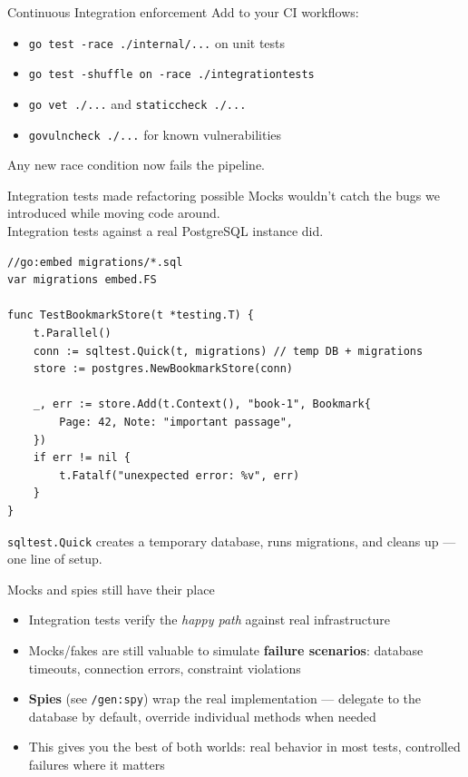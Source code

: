 \documentclass[aspectratio=169,11pt]{beamer}
\begin{document}
\begin{frame}{Continuous Integration enforcement}
  Add to your CI workflows:
  \begin{itemize}
    \setlength\itemsep{5pt}
    \item \texttt{go test -race ./internal/...} on unit tests
    \item \texttt{go test -shuffle on -race ./integrationtests}
    \item \texttt{go vet ./...} and \texttt{staticcheck ./...}
    \item \texttt{govulncheck ./...} for known vulnerabilities
  \end{itemize}

  \vspace{6pt}
  \alert{Any new race condition now fails the pipeline.}
\end{frame}

\begin{frame}[fragile]{Integration tests made refactoring possible}
  Mocks wouldn't catch the bugs we introduced while moving code around.\\
  Integration tests against a real PostgreSQL instance did.

  \vspace{6pt}
\begin{lstlisting}
//go:embed migrations/*.sql
var migrations embed.FS

func TestBookmarkStore(t *testing.T) {
	t.Parallel()
	conn := sqltest.Quick(t, migrations) // temp DB + migrations
	store := postgres.NewBookmarkStore(conn)

	_, err := store.Add(t.Context(), "book-1", Bookmark{
		Page: 42, Note: "important passage",
	})
	if err != nil {
		t.Fatalf("unexpected error: %v", err)
	}
}
\end{lstlisting}

  \vspace{4pt}
  {\small \texttt{sqltest.Quick} creates a temporary database, runs migrations, and cleans up --- one line of setup.}
\end{frame}

\begin{frame}{Mocks and spies still have their place}
  \begin{itemize}
    \setlength\itemsep{6pt}
    \item Integration tests verify the \emph{happy path} against real infrastructure
    \item Mocks/fakes are still valuable to simulate \textbf{failure scenarios}:
      database timeouts, connection errors, constraint violations
    \item \textbf{Spies} (see \texttt{/gen:spy}) wrap the real implementation ---
      delegate to the database by default, override individual methods when needed
    \item This gives you the best of both worlds:
      real behavior in most tests, controlled failures where it matters
  \end{itemize}
\end{frame}
\end{document}
